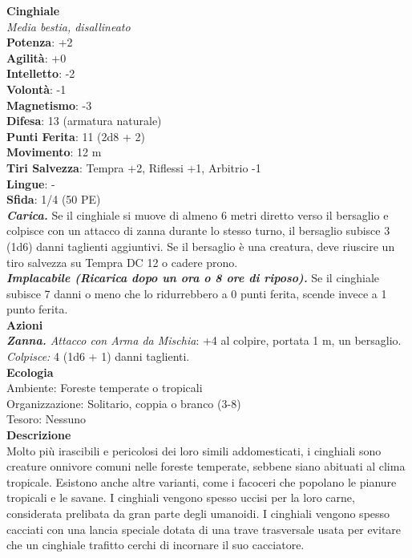 \begin{multicols}{2}
\medskip\textbf{Cinghiale}\\
\emph{Media bestia, disallineato}\\
\textbf{Potenza}: +2\\
\textbf{Agilità}: +0\\
\textbf{Intelletto}: -2\\
\textbf{Volontà}: -1\\
\textbf{Magnetismo}: -3\\
\textbf{Difesa}: 13 (armatura naturale)\\
\textbf{Punti Ferita}: 11 (2d8 + 2)\\
\textbf{Movimento}: 12 m\\
\textbf{Tiri Salvezza}: Tempra +2, Riflessi +1, Arbitrio -1 \\
\textbf{Lingue}: -\\
\textbf{Sfida}: 1/4 (50 PE)\smallskip\\
\emph{\textbf{Carica.}} Se il cinghiale si muove di almeno 6 metri diretto verso il bersaglio e colpisce con un attacco di zanna durante lo stesso turno, il bersaglio subisce 3 (1d6) danni taglienti aggiuntivi. Se il bersaglio è una creatura, deve riuscire un tiro salvezza su Tempra DC  12 o cadere prono.\\
\emph{\textbf{Implacabile (Ricarica dopo un ora o 8 ore di riposo).}} Se il cinghiale subisce 7 danni o meno che lo ridurrebbero a 0 punti ferita, scende invece a 1 punto ferita.\\
\smallskip\textbf{Azioni}\\
\emph{\textbf{Zanna.} Attacco con Arma da Mischia}: +4 al colpire, portata 1 m, un bersaglio.\\
\emph{Colpisce:} 4 (1d6 + 1) danni taglienti. \\
\textbf{Ecologia}\\
Ambiente: Foreste temperate o tropicali\\
Organizzazione: Solitario, coppia o branco (3-8)\\
Tesoro: Nessuno\\
\textbf{Descrizione}\\

Molto più irascibili e pericolosi dei loro simili addomesticati, i cinghiali sono creature onnivore comuni nelle foreste temperate, sebbene siano abituati al clima tropicale. Esistono anche altre varianti, come i facoceri che popolano le pianure tropicali e le savane. I cinghiali vengono spesso uccisi per la loro carne, considerata prelibata da gran parte degli umanoidi. I cinghiali vengono spesso cacciati con una lancia speciale dotata di una trave trasversale usata per evitare che un cinghiale trafitto cerchi di incornare il suo cacciatore.\\


\end{multicols}
